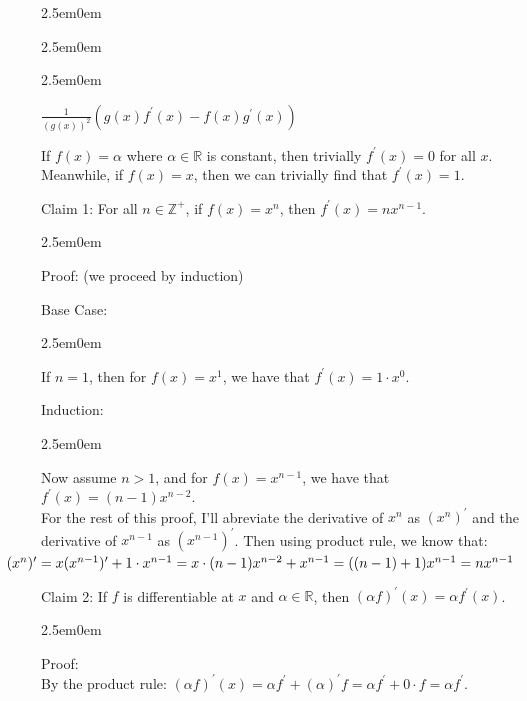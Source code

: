 \documentclass{book}
\newcommand{\exOne}{%
   \color{Purple}%
   \fontsize{14}{16}\selectfont%
}
\newcommand{\exTwo}{%
   \color{RedViolet}%
   \fontsize{13}{15}\selectfont%
}
\newcommand{\exP}{%
   \color{VioletRed}%
   \fontsize{12}{14}\selectfont%
}
\newenvironment{myIndent}{%
   \begin{adjustwidth}{2.5em}{0em}%
}{%
   \end{adjustwidth}%
}
\newcommand{\retTwo}{\hfill\bigbreak}
\begin{document}
{\begin{myIndent}
\begin{myIndent}
\begin{myIndent}
\begin{itemize}
            {\centering $\frac{1}{(g(x))^2}\left(g(x)f^\prime(x) - f(x)g^\prime(x)\right)$\par}
         \end{itemize}
      \end{myIndent}
   \end{myIndent}
\end{myIndent}}

\newpage

\exOne

If $f(x) = \alpha$ where $\alpha \in \mathbb{R}$ is constant, then trivially $f^\prime(x) = 0$ for all $x$.\\ Meanwhile, if $f(x) = x$, then we can trivially find that $f^\prime(x) = 1$.\retTwo

Claim 1: For all $n \in \mathbb{Z}^+$, if $f(x) = x^n$, then $f^\prime(x) = nx^{n-1}$.\\ [-15pt]

{\begin{myIndent}\exTwo
   Proof: (we proceed by induction)\retTwo

   Base Case: 
   {\begin{myIndent} \exP
      If $n = 1$, then for $f(x) = x^1$, we have that $f^\prime(x) = 1\cdot x^0$.\retTwo
   \end{myIndent}}

   Induction: 
   {\begin{myIndent}\exP
      Now assume $n > 1$, and for $f(x) = x^{n-1}$, we have that ${f^\prime(x) = (n-1)x^{n-2}\text{.}}$\\ For the rest of this proof, I'll abreviate the derivative of $x^n$ as $(x^n)^\prime$ and the\\ derivative of $x^{n-1}$ as $(x^{n-1})^\prime$. Then using product rule, we know that:\\ [-11pt]

      ${\hspace{-2.5em}(x^n)^\prime = x(x^{n-1})^\prime + 1\cdot x^{n-1} = x\cdot (n-1)x^{n-2} + x^{n-1} = ((n-1) + 1)x^{n-1} = nx^{n-1}}$\retTwo
   \end{myIndent}}
\end{myIndent}}

Claim 2: If $f$ is differentiable at $x$ and $\alpha \in \mathbb{R}$, then $(\alpha f)^\prime(x) = \alpha f^\prime(x)$.\\ [-15pt]

{\begin{myIndent}\exTwo
   Proof:\\ By the product rule: $(\alpha f)^\prime(x) = \alpha f^\prime + (\alpha)^\prime f = \alpha f^\prime + 0\cdot f = \alpha f^\prime$.\retTwo
\end{myIndent}}
\end{document}
